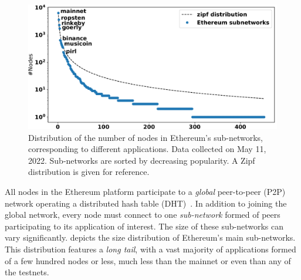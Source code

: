 \begin{figure}[t]
    \includegraphics[width=1\linewidth]{img/ecosystem}
    \caption{Distribution of the number of nodes in Ethereum's sub-networks, corresponding to different applications.
    Data collected on May 11, 2022.
    Sub-networks are sorted by decreasing popularity.
    A Zipf distribution is given for reference.
    \protect{}
    }
    \label{fig:ecosystem}
\end{figure}

All nodes in the Ethereum platform participate to a \emph{global} peer-to-peer (P2P) network operating a distributed hash table (DHT)~\cite{maymounkov2002kademlia}.
In addition to joining the global network, every node must connect to one \emph{sub-network} formed of peers participating to its application of interest.
The size of these sub-networks can vary significantly.
 depicts the size distribution of Ethereum's main sub-networks.
This distribution features a \emph{long tail}, with a vast majority of applications formed of a few hundred nodes or less, much less than the mainnet or even than any of the testnets.

